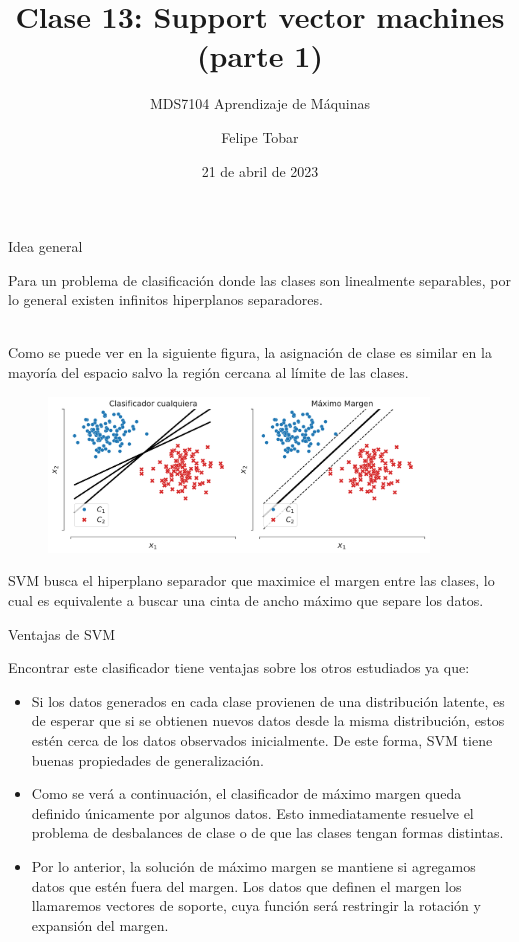 \documentclass[handout, 9pt]{beamer}
\title{Clase 13: Support vector machines (parte 1)}
\subtitle{MDS7104 Aprendizaje de Máquinas}
\date{21 de abril de 2023}
\author{Felipe Tobar}
\institute{Iniciativa de Datos e Inteligencia Artificial\\Universidad de Chile}
\begin{document}
\begin{frame}
  \titlepage
\end{frame}

\begin{frame}{Idea general}

Para un problema de clasificación donde las clases son linealmente separables, por lo general existen infinitos hiperplanos separadores.\\~\ \pause

Como se puede ver en la siguiente figura, la asignación de clase es similar en la mayoría del espacio salvo la región cercana al límite de las clases.

\begin{figure}[ht]
    \centering
    \includegraphics[width=0.9\textwidth]{../../img/cap5_max_margen.pdf}
\end{figure}\pause

SVM busca el hiperplano separador que maximice el margen entre las clases, lo cual es equivalente a buscar una cinta de ancho máximo que separe los datos.
	
\end{frame}


\begin{frame}{Ventajas de SVM}

Encontrar este clasificador tiene ventajas sobre los otros estudiados ya que:

\begin{itemize}
	\item Si los datos generados en cada clase provienen de una distribución latente, es de esperar que si se obtienen nuevos datos desde la misma distribución, estos estén cerca de los datos observados inicialmente. De este forma, SVM tiene buenas propiedades de generalización.\pause
	\item Como se verá a continuación, el clasificador de máximo margen queda definido únicamente por algunos datos. Esto inmediatamente resuelve el problema de desbalances de clase o de que las clases tengan formas distintas.\pause
	\item Por lo anterior, la solución de máximo margen se mantiene si agregamos datos que estén fuera del margen. Los datos que definen el margen los llamaremos vectores de soporte, cuya función será restringir la rotación y expansión del margen.
\end{itemize}
	
\end{frame}
\end{document}

